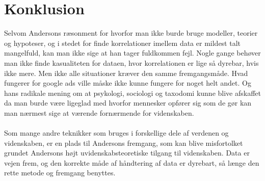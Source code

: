 \section{Konklusion}
Selvom Andersons ræsonment for hvorfor man ikke burde bruge modeller, 
teorier og hypoteser, og i stedet for finde korrelationer imellem data er 
mildest talt mangelfuld, kan man ikke sige at han tager fuldkommen fejl. 
Nogle gange behøver man ikke finde kasualiteten for dataen, hvor korrelationen 
er lige så dyrebar, hvis ikke mere. Men ikke alle situationer kræver den samme 
fremgangsmåde. Hvad fungerer for google ads ville måske ikke kunne fungere for 
noget helt andet. Og hans radikale mening om at psykologi, sociologi og 
taxodomi kunne blive afskaffet da man burde være ligeglad med hvorfor 
mennesker opfører sig som de gør kan man nærmest sige at værende fornærmende 
for videnskaben.\\\\

Som mange andre teknikker som bruges i forskellige dele af verdenen og videnskaben, 
er en plads til Andersons fremgang, som kan blive misfortolket grundet Andersons højt 
uvidenskabsteoretiske tilgang til videnskaben. Data er vejen frem, og den korrekte 
måde af håndtering af data er dyrebart, så længe den rette metode og fremgang benyttes.
